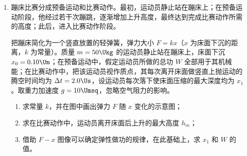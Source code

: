 \documentclass[\gkver]{gaokaozhenti}
\begin{document}
\begin{enumerate}
{\begin{enumerate}
	\item
	$v=\sqrt{\frac{2qU}{m}}$

	\item
	$R=\frac{1}{B}\sqrt{\frac{2mU}{q}}$

\end{enumerate}
}

\item
蹦床比赛分成预备运动和比赛动作。最初，运动员静止站在蹦床上；在预备运动阶段，他经过若干次蹦跳，逐渐增加上升高度，最终达到完成比赛动作所需的高度；此后，进入比赛动作阶段。

把蹦床简化为一个竖直放置的轻弹簧，弹力大小 $F=kx$（$x$ 为床面下沉的距离，$k$ 为常量）。质量 $m=50\Ukg$ 的运动员静止站在蹦床上，床面下沉 $x_{0}=0.10\Um$；在预备运动中，假定运动员所做的总功 $W$ 全部用于其机械能；在比赛动作中，把该运动员视作质点，其每次离开床面做竖直上抛运动的腾空时间均为 $\Delta t=2.0\Us$，设运动员每次落下使床面压缩的最大深度均为 $x_{1}$。取重力加速度 $g=10\Umsq$，忽略空气阻力的影响。
\begin{enumerate}
	\item
	求常量 $k$，并在图中画出弹力 $F$ 随 $x$ 变化的示意图；
	\item
	求在比赛动作中，运动员离开床面后上升的最大高度 $h_{m}$；
	\item
	借助 $F-x$ 图像可以确定弹性做功的规律，在此基础上，求 $x_{1}$ 和 $W$ 的值。
\end{enumerate}
\end{enumerate}
\end{document}
